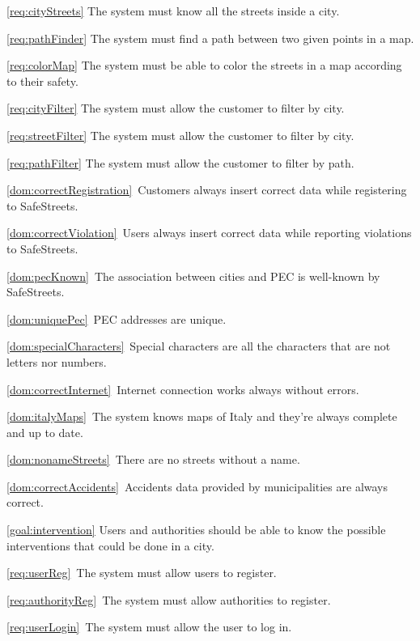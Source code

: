 \begin{description}
\begin{description}
					\item \ref{req:cityStreets} The system must know all the streets inside a city.
					\item \ref{req:pathFinder} The system must find a path between two given points in a map.
					\item \ref{req:colorMap} The system must be able to color the streets in a map according to their safety.
					\item \ref{req:cityFilter} The system must allow the customer to filter by city.
					\item \ref{req:streetFilter} The system must allow the customer to filter by city.
					\item \ref{req:pathFilter} The system must allow the customer to filter by path.
					\item \ref{dom:correctRegistration}\ Customers always insert correct data while registering to SafeStreets.
					\item \ref{dom:correctViolation}\ Users always insert correct data while reporting violations to SafeStreets.
					\item \ref{dom:pecKnown}\ The association between cities and PEC is well-known by SafeStreets.
					\item \ref{dom:uniquePec}\ PEC addresses are unique.
					\item \ref{dom:specialCharacters}\ Special characters are all the characters that are not letters nor numbers.
					\item \ref{dom:correctInternet}\ Internet connection works always without errors.
					\item \ref{dom:italyMaps}\ The system knows maps of Italy and they’re always complete and up to date.
					\item \ref{dom:nonameStreets}\ There are no streets without a name.
					\item \ref{dom:correctAccidents}\ Accidents data provided by municipalities are always correct.
				\end{description}	
			\item \ref{goal:intervention} Users and authorities should be able to know the possible interventions that could be done in a city.
				\begin{description}
					\item \ref{req:userReg}\ The system must allow users to register.
					\item \ref{req:authorityReg}\ The system must allow authorities to register.
					\item \ref{req:userLogin}\ The system must allow the user to log in.

\end{description}
\end{description}
